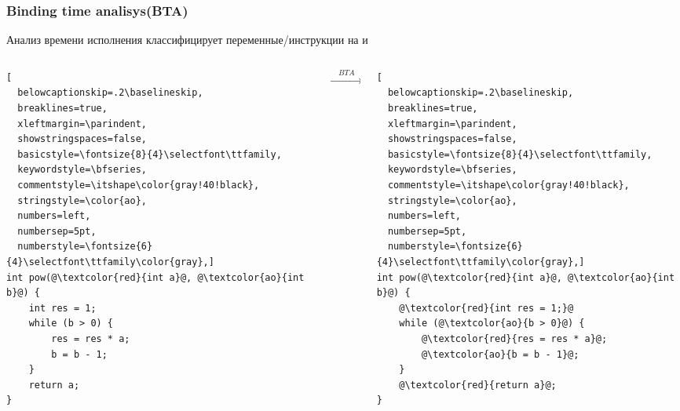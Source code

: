 \documentclass{beamer}
\begin{document}
\lstset{language=C}
\begin{frame}[fragile]\frametitle{Binding time analisys(BTA)}
Анализ времени исполнения классифицирует переменные/инструкции на \color{ao}{статические} \color{black} и \color{red}{динамические}
\vfill
\color{black}
\begin{columns}
\begin{column}{0.4\textwidth}
\begin{lstlisting}[
  belowcaptionskip=.2\baselineskip,
  breaklines=true,
  xleftmargin=\parindent,
  showstringspaces=false,
  basicstyle=\fontsize{8}{4}\selectfont\ttfamily,
  keywordstyle=\bfseries,
  commentstyle=\itshape\color{gray!40!black},
  stringstyle=\color{ao},
  numbers=left,
  numbersep=5pt,
  numberstyle=\fontsize{6}{4}\selectfont\ttfamily\color{gray},]
int pow(@\textcolor{red}{int a}@, @\textcolor{ao}{int b}@) {
    int res = 1;
    while (b > 0) {
        res = res * a;
        b = b - 1;
    }
    return a;
}
\end{lstlisting}
\end{column}
\begin{column}{0.2\textwidth}
$$\xrightarrow{\quad BTA \quad}$$
\end{column}
\begin{column}{0.4\textwidth}
\begin{lstlisting}[
  belowcaptionskip=.2\baselineskip,
  breaklines=true,
  xleftmargin=\parindent,
  showstringspaces=false,
  basicstyle=\fontsize{8}{4}\selectfont\ttfamily,
  keywordstyle=\bfseries,
  commentstyle=\itshape\color{gray!40!black},
  stringstyle=\color{ao},
  numbers=left,
  numbersep=5pt,
  numberstyle=\fontsize{6}{4}\selectfont\ttfamily\color{gray},]
int pow(@\textcolor{red}{int a}@, @\textcolor{ao}{int b}@) {
    @\textcolor{red}{int res = 1;}@
    while (@\textcolor{ao}{b > 0}@) {
        @\textcolor{red}{res = res * a}@;
        @\textcolor{ao}{b = b - 1}@;
    }
    @\textcolor{red}{return a}@;
}
\end{lstlisting}
\end{column}
\end{columns}
\end{frame}
\end{document}
